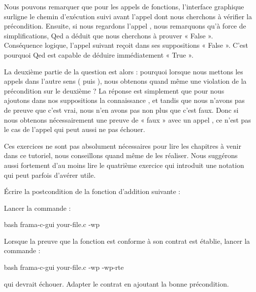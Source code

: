 

Nous pouvons remarquer que pour les appels de fonctions, l'interface graphique
surligne le chemin d'exécution suivi avant l'appel dont nous cherchons à
vérifier la précondition. Ensuite, si nous regardons l'appel ,
nous remarquons qu'à force de simplifications, Qed a déduit que nous
cherchons à prouver « False ». Conséquence logique, l'appel suivant 
reçoit dans ses suppositions « False ». C'est pourquoi Qed est capable de déduire
immédiatement « True ».



La deuxième partie de la question est alors : pourquoi lorsque nous mettons les
appels dans l'autre sens ( puis ), nous obtenons
quand même une violation de la précondition sur le deuxième ? La réponse est
simplement que pour  nous ajoutons dans nos suppositions la
connaissance , et tandis que nous n'avons pas de preuve
que c'est vrai, nous n'en avons pas non plus que c'est faux. Donc si nous obtenons
nécessairement une preuve de « faux » avec un appel , ce n'est
pas le cas de l'appel  qui peut aussi ne pas échouer.




Ces exercices ne sont pas absolument nécessaires pour lire les chapitres à
venir dans ce tutoriel, nous conseillons quand même de les réaliser. Nous
suggérons aussi fortement d'au moins lire le quatrième exercice qui introduit
une notation qui peut parfois d'avérer utile.




Écrire la postcondition de la fonction d'addition suivante :




Lancer la commande :

\begin{CodeBlock}{bash}
frama-c-gui your-file.c -wp
\end{CodeBlock}


Lorsque la preuve que la fonction est conforme à son contrat est établie, lancer
la commande :

\begin{CodeBlock}{bash}
frama-c-gui your-file.c -wp -wp-rte
\end{CodeBlock}


qui devrait échouer. Adapter le contrat en ajoutant la bonne précondition.


